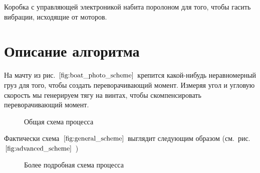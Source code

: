 \documentclass[a4paper]{article}
\begin{document}
Коробка с управляющей электроникой набита поролоном для того, чтобы гасить вибрации, исходящие от моторов.



\section{Описание алгоритма}

На мачту из рис. $\ref{fig:boat_photo_scheme}$ крепится какой-нибудь неравномерный груз для того, чтобы создать переворачивающий момент. Измеряя угол и угловую скорость мы генерируем тягу на винтах, чтобы скомпенсировать переворачивающий момент.

\begin{figure}[h!]
	\caption{Общая схема процесса}
	\label{fig:general_scheme}
\end{figure}

Фактически схема~$\ref{fig:general_scheme}$ выглядит следующим образом (см.~рис.~$\ref{fig:advanced_scheme}$ )

\begin{figure}[h!]
	\caption{Более подробная схема процесса}
	\label{fig:advanced_scheme}
\end{figure}
\end{document}
